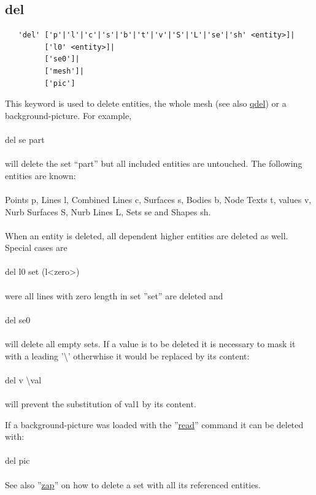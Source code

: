 \documentclass{article}
\providecommand{\htmlref}[2]{\hyperref[#2]{#1}}
\begin{document}
\subsection{\label{del}del}
\begin{verbatim}
   'del' ['p'|'l'|'c'|'s'|'b'|'t'|'v'|'S'|'L'|'se'|'sh' <entity>]|
         ['l0' <entity>]|
         ['se0']|
         ['mesh']|
         ['pic'] 
\end{verbatim}
This keyword is used to delete entities, the whole mesh (see also \htmlref{qdel}{qdel}) or a background-picture. For example,\\\\
del se part\\\\
will delete the set ``part'' but all included entities are untouched. The following entities are known:\\\\
Points p, Lines l, Combined Lines c, Surfaces s, Bodies b, Node Texts t, values v, Nurb Surfaces S, Nurb Lines L, Sets se and Shapes sh.\\\\
When an entity is deleted, all dependent higher entities are deleted as well. Special cases are\\\\del l0 set  (l<zero>)\\\\were all lines with zero length in set ''set'' are deleted and\\\\del se0\\\\will delete all empty sets.
If a value is to be deleted it is necessary to mask it with a leading '\textbackslash{}' otherwhise it would be replaced by its content:\\\\del v \textbackslash{}val\\\\will prevent the substitution of val1 by its content.

If a background-picture was loaded with the ''\htmlref{read}{read}'' command it can be deleted with:\\\\
del pic
\\\\See also ''\htmlref{zap}{zap}'' on how to delete a set with all its referenced entities.
\end{document}

